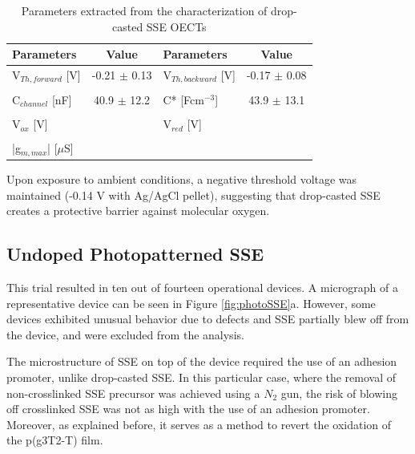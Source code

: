 \begin{table}[ht]
\centering
\caption{Parameters extracted from the characterization of drop-casted SSE OECTs}
\begin{tabular}{l|c||l|c}
Parameters & Value & Parameters & Value \\\hline \hline
V$_{Th,forward}$ [V] & -0.21 $\pm$ 0.13 & V$_{Th,backward}$ [V] & -0.17 $\pm$ 0.08\\
& & &\\[-1em]
C$_{channel}$ [nF] & 40.9 $\pm$ 12.2 & C* [Fcm$^{-3}$] &  43.9 $\pm$ 13.1 \\
& & &\\[-1em]
V$_{ox}$ [V] &  & V$_{red}$ [V] &  \\
& & &\\[-1em]
|g$_{m,max}$| [$\mu$S] &  &  &\\\hline
\end{tabular}
\label{tab:dropfom}
\end{table}

Upon exposure to ambient conditions, a negative threshold voltage was maintained (-0.14 V with Ag/AgCl pellet), suggesting that drop-casted SSE creates a protective barrier against molecular oxygen.%

\subsection{Undoped Photopatterned SSE} %
This trial resulted in ten out of fourteen operational devices. A micrograph of a representative device can be seen in Figure \ref{fig:photoSSE}a. However, some devices exhibited unusual behavior due to defects and SSE partially blew off from the device, and were excluded from the analysis.

The microstructure of SSE on top of the device required the use of an adhesion promoter, unlike drop-casted SSE. In this particular case, where the removal of non-crosslinked SSE precursor was achieved using a $N_{2}$ gun, the risk of blowing off crosslinked SSE was not as high with the use of an adhesion promoter. Moreover, as explained before, it serves as a method to revert the oxidation of the p(g3T2-T) film.


